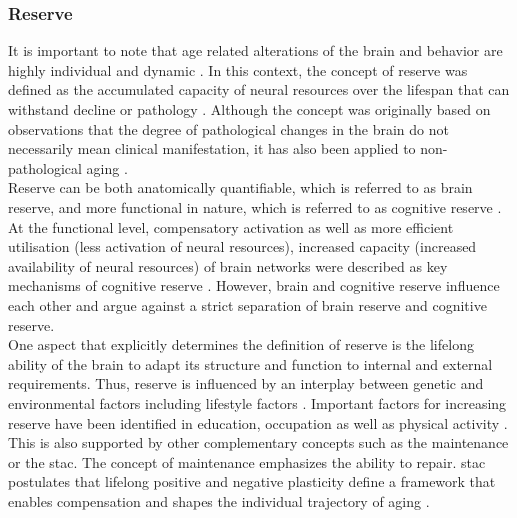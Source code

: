 \subsubsection{Reserve}
\label{theory:aging:reserve}
It is important to note that age related alterations of the brain and behavior are highly individual and dynamic \cite{Smith2020,Koen2019,Douw2014}. In this context, the concept of reserve was defined as the accumulated capacity of neural resources over the lifespan that can withstand decline or pathology \cite{Cabeza2018, Stern2009}. Although the concept was originally based on observations that the degree of pathological changes in the brain do not necessarily mean clinical manifestation, it has also been applied to non-pathological aging \cite{Esiri2001,Cabeza2018,Stern2009}.\\
Reserve can be both anatomically quantifiable, which is referred to as brain reserve, and more functional in nature, which is referred to as cognitive reserve \cite{Stern2009}. At the functional level, compensatory activation as well as more efficient utilisation (less activation of neural resources), increased capacity (increased availability of neural resources) of brain networks were described as key mechanisms of cognitive reserve \cite{Stern2004,Stern2009}. However, brain and cognitive reserve influence each other and \citeauthor{Cabeza2018} \cite{Cabeza2018} argue against a strict separation of brain reserve and cognitive reserve.\\
One aspect that explicitly determines the definition of reserve is the lifelong ability of the brain to adapt its structure and function to internal and external requirements. Thus, reserve is influenced by an interplay between genetic and environmental factors including lifestyle factors \cite{Cabeza2018}. Important factors for increasing reserve have been identified in education, occupation as well as physical activity \cite{Cabeza2018,Stern2009}. This is also supported by other complementary concepts such as the maintenance or the \gls{stac}. The concept of maintenance emphasizes the ability to repair. \Gls{stac} postulates that lifelong positive and negative plasticity define a framework that enables compensation and shapes the individual trajectory of aging \cite{Reuter-Lorenz2014}.\\        

